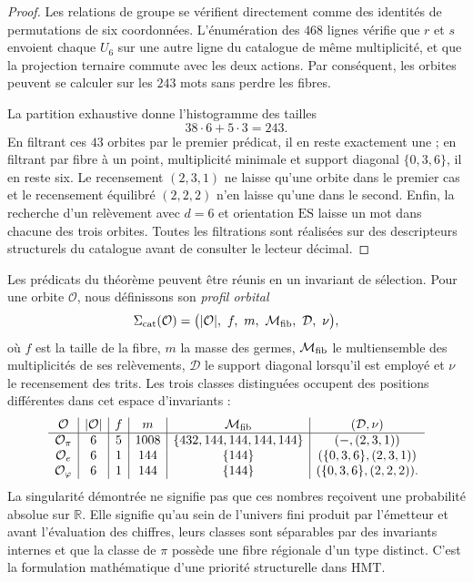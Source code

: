 \begin{proof}
Les relations de groupe se vérifient directement comme des identités de
permutations de six coordonnées. L'énumération des \(468\) lignes
vérifie que \(r\) et \(s\) envoient chaque \(U_6\) sur une autre ligne du catalogue de
même multiplicité, et que la projection ternaire commute avec les deux
actions. Par conséquent, les orbites peuvent se calculer sur les \(243\) mots
sans perdre les fibres.

La partition exhaustive donne l'histogramme des tailles
\[
 38\cdot6+5\cdot3=243.
\]
En filtrant ces \(43\) orbites par le premier prédicat, il en reste exactement une ;
en filtrant par fibre à un point, multiplicité minimale et support diagonal
\(\{0,3,6\}\), il en reste six. Le recensement \((2,3,1)\) ne laisse qu'une orbite dans le
premier cas et le recensement équilibré \((2,2,2)\) n'en laisse qu'une dans le second.
Enfin, la recherche d'un relèvement avec \(d=6\) et orientation
\(\mathrm{ES}\) laisse un mot dans chacune des trois orbites. Toutes les
filtrations sont réalisées sur des descripteurs structurels du catalogue avant de consulter le
lecteur décimal.
\end{proof}

Les prédicats du théorème peuvent être réunis en un invariant de sélection.
Pour une orbite \(\mathcal O\), nous définissons son \emph{profil orbital}
\[
 \Sigma_{\rm cat}(\mathcal O)=
 \bigl(
 |\mathcal O|,\ f,\ m,\ \mathcal M_{\rm fib},\
 \mathcal D,\ \nu
 \bigr),
\]
où \(f\) est la taille de la fibre, \(m\) la masse des germes,
\(\mathcal M_{\rm fib}\) le multiensemble des multiplicités de ses
relèvements, \(\mathcal D\) le support diagonal lorsqu'il est employé et \(\nu\)
le recensement des trits. Les trois classes distinguées occupent des positions différentes
dans cet espace d'invariants :
\[
\begin{array}{c|c|c|c|c|c}
\mathcal O&|\mathcal O|&f&m&\mathcal M_{\rm fib}&(\mathcal D,\nu)\\ \hline
\mathcal O_\pi&6&5&1008&\{432,144,144,144,144\}&(-,(2,3,1))\\
\mathcal O_e&6&1&144&\{144\}&(\{0,3,6\},(2,3,1))\\
\mathcal O_\varphi&6&1&144&\{144\}&(\{0,3,6\},(2,2,2)).
\end{array}
\]
La singularité démontrée ne signifie pas que ces nombres reçoivent une
probabilité absolue sur \(\mathbb R\). Elle signifie qu'au sein de l'univers
fini produit par l'émetteur et avant l'évaluation des chiffres, leurs classes sont
séparables par des invariants internes et que la classe de \(\pi\) possède une fibre
régionale d'un type distinct. C'est la formulation mathématique d'une
priorité structurelle dans HMT\@.

